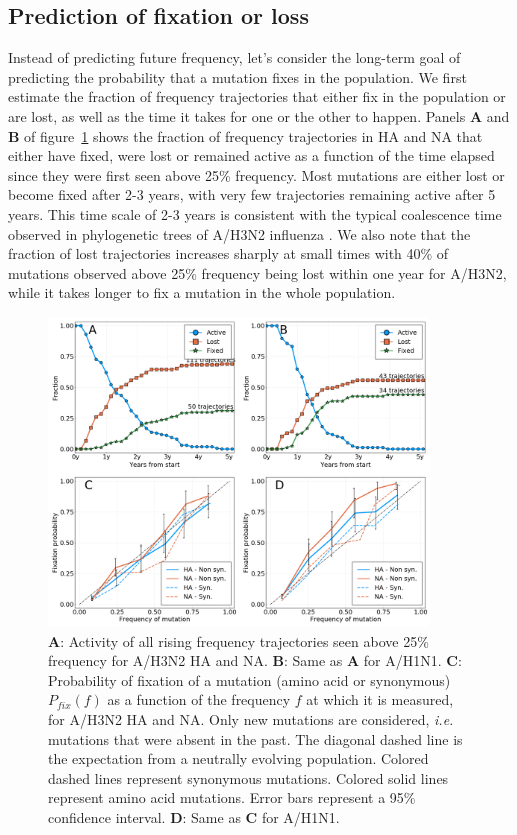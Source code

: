 \documentclass[reprint,amsmath,amssymb,superscriptaddress,showpacs,rmp]{revtex4-1}
\begin{document}
\subsection*{Prediction of fixation or loss}
Instead of predicting future frequency, let's consider the long-term goal of predicting the probability that a mutation fixes in the population. 
We first estimate the fraction of frequency trajectories that either fix in the population or are lost, as well as the time it takes for one or the other to happen. 
Panels \textbf{A} and \textbf{B} of figure~\ref{fig:fix_loss_active} shows the fraction of frequency trajectories in HA and NA that either have fixed, were lost or remained active as a function of the time elapsed since they were first seen above 25\% frequency. 
Most mutations are either lost or become fixed after 2-3 years, with very few trajectories remaining active after 5 years.
This time scale of 2-3 years is consistent with the typical coalescence time observed in phylogenetic trees of A/H3N2 influenza \citep{rambaut_genomic_2008,yan_phylodynamic_2019}. 
We also note that the fraction of lost trajectories increases sharply at small times with 40\% of mutations observed above 25\% frequency being lost within one year for A/H3N2, while it takes longer to fix a mutation in the whole population. 

\begin{figure}
	\centering
	\includegraphics[width=0.9\textwidth]{./Figures/Panel2.png}
	\caption{\textbf{A}: Activity of all rising frequency trajectories seen above 25\% frequency for A/H3N2 HA and NA. \textbf{B}: Same as \textbf{A} for A/H1N1. \textbf{C}: Probability of fixation of a mutation (amino acid or synonymous) $P_{fix}(f)$ as a function of the frequency $f$ at which it is measured, for A/H3N2 HA and NA. Only new mutations are considered, \emph{i.e.} mutations that were absent in the past. The diagonal dashed line is the expectation from a neutrally evolving population. Colored dashed lines represent synonymous mutations. Colored solid lines represent amino acid mutations. Error bars represent a 95\% confidence interval. \textbf{D}: Same as \textbf{C} for A/H1N1.}
	\label{fig:fix_loss_active}
\end{figure}
\end{document}
